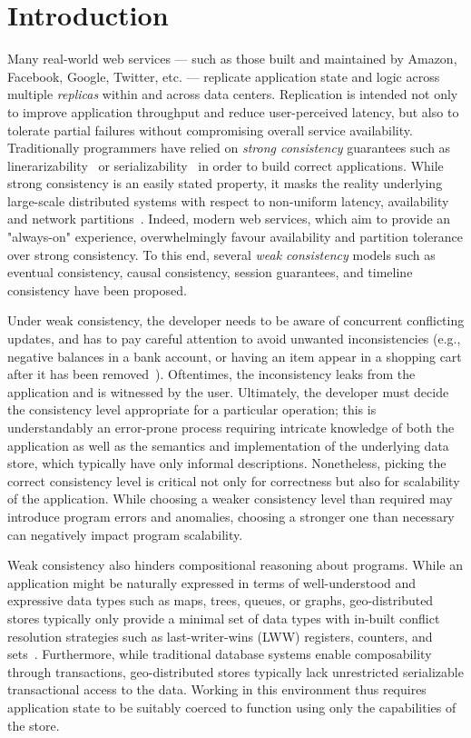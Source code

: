 \section{Introduction}

Many real-world web services --- such as those built and maintained by Amazon,
Facebook, Google, Twitter, etc. --- replicate application state and logic
across multiple \emph{replicas} within and across data centers. Replication is
intended not only to improve application throughput and reduce user-perceived
latency, but also to tolerate partial failures without compromising overall
service availability. Traditionally programmers have relied on \emph{strong
consistency} guarantees such as linerarizability~\cite{Herlihy1990} or
serializability~\cite{Serializability} in order to build correct applications.
While strong consistency is an easily stated property, it masks the reality
underlying large-scale distributed systems with respect to non-uniform latency,
availability and network partitions~\cite{Brewer2000,Gilbert2002}. Indeed,
modern web services, which aim to provide an "always-on" experience,
overwhelmingly favour availability and partition tolerance over strong
consistency. To this end, several \emph{weak consistency} models such as
eventual consistency, causal consistency, session guarantees, and timeline
consistency have been proposed.

Under weak consistency, the developer needs to be aware of concurrent
conflicting updates, and has to pay careful attention to avoid unwanted
inconsistencies (e.g., negative balances in a bank account, or having an item
appear in a shopping cart after it has been removed~\cite{Dynamo}). Oftentimes,
the inconsistency leaks from the application and is witnessed by the user.
Ultimately, the developer must decide the consistency level appropriate for a
particular operation; this is understandably an error-prone process requiring
intricate knowledge of both the application as well as the semantics and
implementation of the underlying data store, which typically have only informal
descriptions. Nonetheless, picking the correct consistency level is critical
not only for correctness but also for scalability of the application. While
choosing a weaker consistency level than required may introduce program errors
and anomalies, choosing a stronger one than necessary can negatively impact
program scalability.

Weak consistency also hinders compositional reasoning about programs.  While an
application might be naturally expressed in terms of well-understood and
expressive data types such as maps, trees, queues, or graphs, geo-distributed
stores typically only provide a minimal set of data types with in-built
conflict resolution strategies such as last-writer-wins (LWW) registers,
counters, and sets~\cite{Cassandra,DynamoDB}.  Furthermore, while traditional
database systems enable composability through transactions, geo-distributed
stores typically lack unrestricted serializable transactional access to the
data. Working in this environment thus requires application state to be
suitably coerced to function using only the capabilities of the store.

